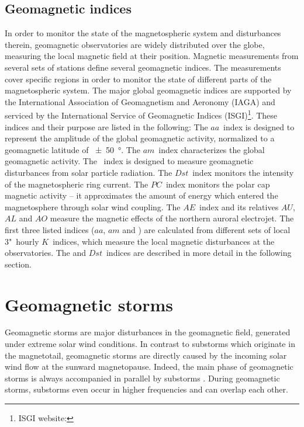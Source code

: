 \subsection{Geomagnetic indices}
\label{sec:geomagnetic_indices}
In order to monitor the state of the magnetospheric system and disturbances therein, geomagnetic observatories are widely distributed over the globe, measuring the local magnetic field at their position. Magnetic measurements from several sets of stations define several geomagnetic indices. The measurements cover specific regions in order to monitor the state of different parts of the magnetospheric system. The major global geomagnetic indices are supported by the International Association of Geomagnetism and Aeronomy (IAGA) and serviced by the International Service of Geomagnetic Indices (ISGI)\footnote{ISGI website: }. These indices and their purpose are listed in the following: The $aa$~index is designed to represent the amplitude of the global geomagnetic activity, normalized to a geomagnetic latitude of \SI{+-50}{\degree}. The $am$~index characterizes the global geomagnetic activity. The \Kp{}~index is designed to measure geomagnetic disturbances from solar particle radiation. The $Dst$~index monitors the intensity of the magnetospheric ring current. The $PC$~index monitors the polar cap magnetic activity -- it approximates the amount of energy which entered the magnetosphere through solar wind coupling. The $AE$~index and its relatives $AU$, $AL$ and $AO$ measure the magnetic effects of the northern auroral electrojet. The first three listed indices ($aa$, $am$ and \Kp{}) are calculated from different sets of local 3"~hourly $K$~indices, which measure the local magnetic disturbances at the observatories.	%
The \Kp{} and $Dst$~indices are described in more detail in the following section.


\section{Geomagnetic storms}
\label{sec:geomagnetic_storms}
Geomagnetic storms are major disturbances in the geomagnetic field, generated under extreme solar wind conditions. In contrast to substorms which originate in the magnetotail, geomagnetic storms are directly caused by the incoming solar wind flow at the sunward magnetopause. Indeed, the main phase of geomagnetic storms is always accompanied in parallel by substorms \citep{Gonzalez1994}. During geomagnetic storms, substorms even occur in higher frequencies and can overlap each other.

